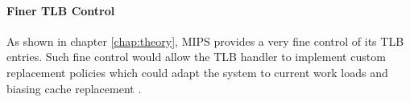 \paragraph{Finer TLB Control} As shown in chapter \ref{chap:theory}, MIPS \cite{MIPSArchitectureProgrammers2016} provides a very fine control of its TLB entries. Such fine control would allow the TLB handler to implement custom replacement policies which could adapt the system to current work loads and biasing cache replacement \cite{park2022every}.


%





%







